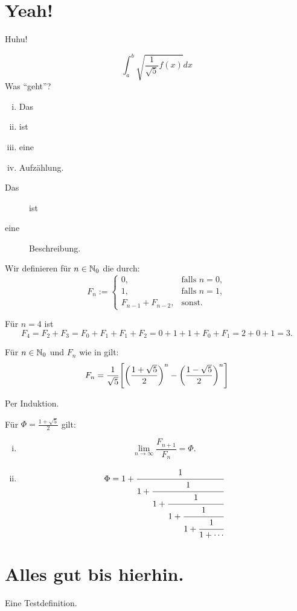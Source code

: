\section{Yeah!}
Huhu! 

\[
	\int_{a}^{b} \sqrt{\frac{1}{\sqrt{5}} f(x)} dx
\]
Was \enquote{geht}? 

\begin{enumerate}[(i)]
	\item Das
	\item ist 
	\item eine
	\item Aufzählung.
\end{enumerate}

\begin{description}
	\item[Das] ist
	\item[eine] Beschreibung.
\end{description}

\begin{definition}
	\label{def:fibonacci}
	Wir definieren für $n \in \mathbb{N}_0$ die  durch:
	\[
		F_n := \begin{cases}
			0, & \text{falls } n = 0, \\
			1, & \text{falls } n = 1, \\
			F_{n-1} + F_{n-2}, & \text{sonst.}
		\end{cases}
	\]
\end{definition}

\begin{beispiel}
	Für $n = 4$ ist
	\[
		F_4 = F_2 + F_3 = F_0 + F_1 + F_1 + F_2 = 0 + 1 + 1 + F_0 + F_1 = 2 + 0 + 1 = 3.
	\]
\end{beispiel}

\begin{satz}
	Für $n \in \mathbb{N}_0$ und $F_n$ wie in  gilt:
	\[
		F_n = \frac{1}{\sqrt{5}} \benb{ \enb{\frac{1+\sqrt{5}}{2}}^n - \enb{\frac{1-\sqrt{5}}{2}}^n}
	\]
\end{satz}

\begin{beweis}
	Per Induktion.
\end{beweis}

\begin{korollar}
	Für $\Phi = \frac{1+\sqrt{5}}{2}$ gilt:
	\begin{enumerate}[(i)]
		\item \[
			\lim\limits_{n \rightarrow \infty} \frac{F_{n+1}}{F_n} = \Phi.
		\]
		\item \[
			\Phi = 1 + \cfrac{1}{1+ \cfrac{1}{1 + \cfrac{1}{1 + \cfrac{1}{1 + \cfrac{1}{1 + \cdots}}}}}
		\]
	\end{enumerate}
\end{korollar}
\lipsum

\section{Alles gut bis hierhin.}
\begin{definition}[Test]
	Eine Testdefinition.
\end{definition}